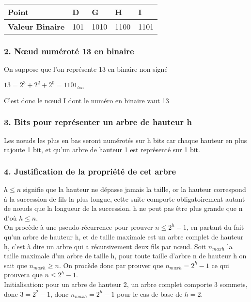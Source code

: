 \documentclass[a4paper,12pt]{article}
\begin{document}
\begin{tabular}{p{3cm}|p{1cm}|p{1cm}|p{1cm}|p{1cm}}
{\bf Point} & D & G & H & I\\
\hline

{\bf Valeur Binaire} & 101 & 1010 & 1100 & 1101
\end{tabular}


\subsubsection*{2. N\oe{}ud numéroté 13 en binaire}

On suppose que l'on représente 13 en binaire non signé

$ 13 = 2^3 + 2^2 + 2^0 = 1101_{bin} $ 

C'est donc le n\oe{}ud I dont le numéro en binaire vaut 13

\subsubsection*{3. Bits pour représenter un arbre de hauteur h}

Les n\oe{}uds les plus en bas seront numérotés sur h bits car chaque hauteur en plus rajoute 1 bit, et qu'un arbre de hauteur 1 est représenté sur 1 bit.

\subsubsection*{4. Justification de la propriété de cet arbre}

$ h \leq n $ signifie que la hauteur ne dépasse jamais la taille, or la hauteur correspond à la succession de fils la plus longue, cette suite comporte obligatoirement autant de n\oe{}uds que la longueur de la succession. h ne peut pas être plus grande que n d'où $ h \leq n $.
\\

On procède à une pseudo-récurrence pour prouver $ n \leq 2^h -1 $, en partant du fait qu'un arbre de hauteur h, et de taille maximale est un arbre complet de hauteur h, c'est à dire un arbre qui a récursivement deux fils par n\oe{}ud. Soit $ n_{maxh} $ la taille maximale d'un arbre de taille h, pour toute taille d'arbre n de hauteur h on sait que $n_{maxh} \geq n$. On procède donc par prouver que $ n_{maxh} = 2^h - 1 $ ce qui prouvera que $ n \leq 2^h -1 $.
\\

Initialisation: pour un arbre de hauteur 2, un arbre complet comporte 3 sommets, donc $ 3 = 2^2 - 1 $, donc $ n_{maxh} =  2^h -1 $ pour le cas de base de $ h = 2 $.
\\
\end{document}
